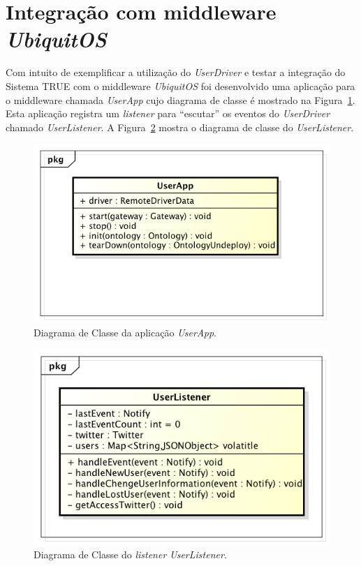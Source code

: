 \section{Integração com middleware \textit{UbiquitOS}}

	Com intuito de exemplificar a utilização do \textit{UserDriver} e testar a integração do Sistema TRUE com o middleware \textit{UbiquitOS} foi desenvolvido uma aplicação para o middleware chamada \textit{UserApp} cujo diagrama de classe é mostrado na Figura~\ref{fig:diagrama-userapp}. Esta aplicação registra um \textit{listener} para ``escutar'' os eventos do \textit{UserDriver} chamado \textit{UserListener}. A Figura~\ref{fig:diagrama-userlistener} mostra o diagrama de classe do \textit{UserListener}.

		\begin{figure}[hbt]
			\begin{center}
				\includegraphics[scale=0.6]{figuras/5.Testes/diagrama-classe-user-ap.png}
			\end{center}
			\caption{Diagrama de Classe da aplicação \textit{UserApp}.}
			\label{fig:diagrama-userapp}
		\end{figure}

		\begin{figure}[hbt]
			\begin{center}
				\includegraphics[scale=0.6]{figuras/5.Testes/diagrama-classe-user-listener.png}
			\end{center}
			\caption{Diagrama de Classe do \textit{listener} \textit{UserListener}.}
			\label{fig:diagrama-userlistener}
		\end{figure}

